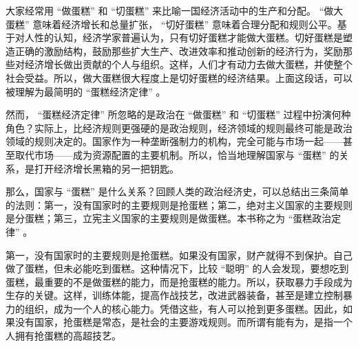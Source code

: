 





大家经常用 “做蛋糕” 和 “切蛋糕” 来比喻一国经济活动中的生产和分配。 “做大蛋糕” 意味着经济增长和总量扩张， “切好蛋糕” 意味着合理分配和规则公平。基于对人性的认知，经济学家普遍认为，只有切好蛋糕才能做大蛋糕。切好蛋糕是塑造正确的激励结构，鼓励那些扩大生产、改进效率和推动创新的经济行为，奖励那些对经济增长做出贡献的个人与组织。这样，人们才有动力去做大蛋糕，并使整个社会受益。所以，做大蛋糕很大程度上是切好蛋糕的经济结果。上面这段话，可以被理解为最简明的 “蛋糕经济定律” 。

然而， “蛋糕经济定律” 所忽略的是政治在 “做蛋糕” 和 “切蛋糕” 过程中扮演何种角色？实际上，比经济规则更强硬的是政治规则，经济领域的规则最终可能是政治领域的规则决定的。国家作为一种垄断强制力的机构，完全可能与市场一起——甚至取代市场——成为资源配置的主要机制。所以，恰当地理解国家与 “蛋糕” 的关系，是打开经济增长黑箱的另一把钥匙。

那么，国家与 “蛋糕” 是什么关系？回顾人类的政治经济史，可以总结出三条简单的法则：第一，没有国家时的主要规则是抢蛋糕；第二，绝对主义国家的主要规则是分蛋糕；第三，立宪主义国家的主要规则是做蛋糕。本书称之为 “蛋糕政治定律” 。

第一，没有国家时的主要规则是抢蛋糕。如果没有国家，财产就得不到保护。自己做了蛋糕，但未必能吃到蛋糕。这种情况下，比较 “聪明” 的人会发现，要想吃到蛋糕，最重要的不是做蛋糕的能力，而是抢蛋糕的能力。所以，获取暴力手段成为生存的关键。这样，训练体能，提高作战技艺，改进武器装备，甚至是建立控制暴力的组织，成为一个人的核心能力。凭借这些，有人可以抢到更多蛋糕。因此，如果没有国家，抢蛋糕是常态，是社会的主要游戏规则。而所谓有能有为，是指一个人拥有抢蛋糕的高超技艺。

